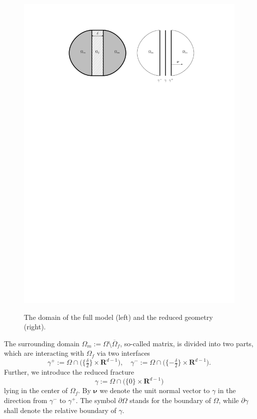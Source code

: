 \documentclass[a4paper]{article}
\def\nnu{\vc\nu}
\def\prtl{\partial}
\def\Real{{\mathbf R}}
\def\vc#1{\mathbf{\boldsymbol{#1}}}     %
\newcommand{\eq}[1]{\begin{equation}#1\end{equation}}
\begin{document}
\begin{figure}[h]
\centering
\includegraphics[width=\textwidth]{figures/omegas}
\label{fig:omegas}
\caption{The domain of the full model (left) and the reduced geometry (right).}
\end{figure}

The surrounding domain $\Omega_m:=\Omega\setminus\overline\Omega_f$, so-called matrix, is divided into two parts, which are interacting with $\Omega_f$ via two interfaces
\eq{ \gamma^+:=\Omega\cap\big( \{\tfrac\delta2\}\times \Real^{d-1}\big), \quad \gamma^-:=\Omega\cap\big( \{ -\tfrac\delta2\}\times \Real^{d-1}\big). }
Further, we introduce the reduced fracture
\eq{ \gamma:=\Omega\cap\big(\{0\}\times\Real^{d-1}\big) }
lying in the center of $\Omega_f$.
By $\nnu$ we denote the unit normal vector to $\gamma$ in the direction from $\gamma^-$ to $\gamma^+$.
The symbol $\prtl\Omega$ stands for the boundary of $\Omega$, while $\prtl\gamma$ shall denote the relative boundary of $\gamma$.
\end{document}
